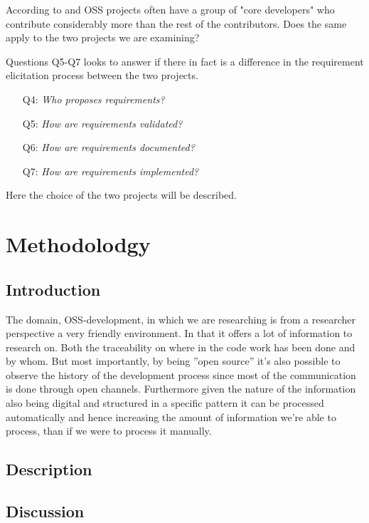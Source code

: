 \documentclass[a4paper,11pt]{article}
\begin{document}
{\begin{itemize}
	According to \cite{Noll} and \cite{Mockus2002a} OSS projects often have a group of "core developers" who contribute considerably more than the rest of the contributors. Does the same apply to the two projects we are examining?
\end{itemize}
Questions Q5-Q7 looks to answer if there in fact is a difference in the requirement elicitation process between the two projects.
\begin{itemize}
	\item[Q4:]\emph{Who proposes requirements?}
	\item[Q5:]\emph{How are requirements validated?}
	\item[Q6:]\emph{How are requirements documented?}
	\item[Q7:]\emph{How are requirements implemented?}
\end{itemize}

Here the choice of the two projects will be described.

\section{Methodolodgy}
\subsection{Introduction}
The domain, OSS-development, in which we are researching is from a researcher perspective a very friendly environment. In that it offers a lot of information to research on. Both the traceability on where in the code work has been done and by whom. But most importantly, by being ''open source'' it's also possible to observe the history of the development process since most of the communication is done through open channels. Furthermore given the nature of the information also being digital and structured in a specific pattern it can be processed automatically and hence increasing the amount of information we're able to process, than if we were to process it manually.
\subsection{Description}

\subsection{Discussion}

}
\end{document}
